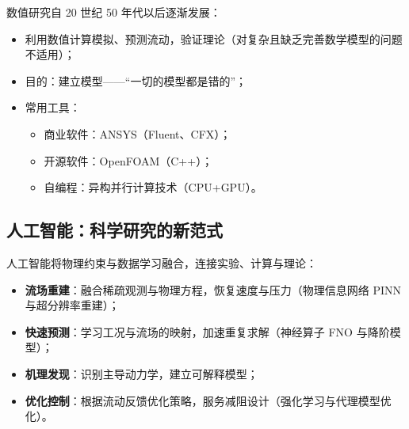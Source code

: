 数值研究自 20 世纪 50 年代以后逐渐发展：
\begin{itemize}
	\item 利用数值计算模拟、预测流动，验证理论（对复杂且缺乏完善数学模型的问题不适用）；
	\item 目的：建立模型——“一切的模型都是错的”；
	\item 常用工具：
	      \begin{itemize}
		      \item 商业软件：ANSYS（Fluent、CFX）；
		      \item 开源软件：OpenFOAM（C++）；
		      \item 自编程：异构并行计算技术（CPU+GPU）。
	      \end{itemize}
\end{itemize}

\subsection{人工智能：科学研究的新范式}

人工智能将物理约束与数据学习融合，连接实验、计算与理论：
\begin{itemize}
	\item \textbf{流场重建}：融合稀疏观测与物理方程，恢复速度与压力（物理信息网络 PINN 与超分辨率重建）；
	\item \textbf{快速预测}：学习工况与流场的映射，加速重复求解（神经算子 FNO 与降阶模型）；
	\item \textbf{机理发现}：识别主导动力学，建立可解释模型；
	\item \textbf{优化控制}：根据流动反馈优化策略，服务减阻设计（强化学习与代理模型优化）。
\end{itemize}
